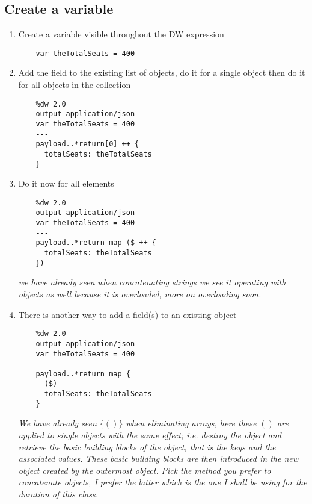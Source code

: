 \subsection{Create a variable}
\begin{enumerate}[resume*]
\item Create a variable visible throughout the DW expression
  \begin{verbatim}
    var theTotalSeats = 400
  \end{verbatim}
\item Add the  field to the existing list of objects, do it for a single object then do it for all objects in the collection
  \begin{verbatim}
    %dw 2.0
    output application/json
    var theTotalSeats = 400
    ---
    payload..*return[0] ++ {
      totalSeats: theTotalSeats
    }
  \end{verbatim}
\item Do it now for all elements
  \begin{verbatim}
    %dw 2.0
    output application/json
    var theTotalSeats = 400
    ---
    payload..*return map ($ ++ {
      totalSeats: theTotalSeats
    })
  \end{verbatim}
  \emph{
    \ttt{++} we have already seen when concatenating strings we see it operating with objects as well because it is overloaded, more on overloading soon.
  }
\item There is another way to add a field(s) to an existing object
  \begin{verbatim}
    %dw 2.0
    output application/json
    var theTotalSeats = 400
    ---
    payload..*return map {
      ($)
      totalSeats: theTotalSeats
    }
  \end{verbatim}
  \emph{
    We have already seen $\{()\}$ when eliminating arrays, here these $()$ are applied to single objects with the same effect; i.e. destroy the object and retrieve the basic building blocks of the object, that is the keys and the associated values.  These basic building blocks are then introduced in the new object created by the outermost object.}
  \newline
  \emph{
    Pick the method you prefer to concatenate objects, I prefer the latter which is the one I shall be using for the duration of this class.
  }
\end{enumerate}

